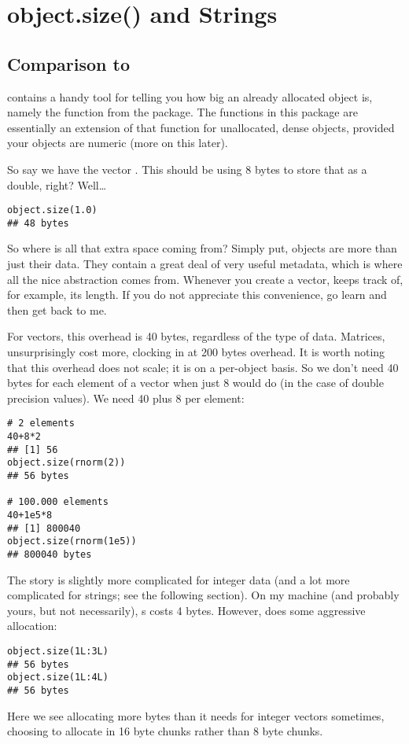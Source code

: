 \section{object.size() and Strings}

\subsection{Comparison to }

\R contains a handy tool for telling you how big an already allocated 
object is, namely the  function from the  
package.  The functions in this package are essentially an extension of that 
function for unallocated, dense objects, provided your objects are numeric (more 
on this later).

So say we have the vector .  This should be using 8 bytes to 
store that  as a double, right?  Well\dots
\begin{lstlisting}[language=rr]
object.size(1.0)
## 48 bytes
\end{lstlisting}

So where is all that extra space coming from?  Simply put, \R objects 
are more than just their data.  They contain a great deal of very useful 
metadata, which is where all the nice abstraction comes from.  Whenever you 
create a vector, \R keeps track of, for example, its length.  If you 
do not appreciate this convenience, go learn  and then get back to 
me.  

For vectors, this overhead is 40 bytes, regardless of the type of data.   
Matrices, unsurprisingly cost more, clocking in at 200 bytes overhead.  It is 
worth noting that this overhead does not scale; it is on a per-object basis.  So 
we don't need 40 bytes for each element of a vector when just 8 would do (in the 
case of double precision values).  We need 40 plus 8 per element:
\begin{lstlisting}[language=rr]
# 2 elements
40+8*2
## [1] 56
object.size(rnorm(2))
## 56 bytes

# 100.000 elements
40+1e5*8
## [1] 800040
object.size(rnorm(1e5))
## 800040 bytes
\end{lstlisting}

The story is slightly more complicated for integer data (and a lot more 
complicated for strings; see the following section).  On my machine (and 
probably yours, but not necessarily), s costs 4 bytes.  However, 
\R does some aggressive allocation:
\begin{lstlisting}[language=rr]
object.size(1L:3L)
## 56 bytes
object.size(1L:4L)
## 56 bytes
\end{lstlisting}
Here we see \R allocating more bytes than it needs for integer vectors 
sometimes, choosing to allocate in 16 byte chunks rather than 8 byte chunks.

